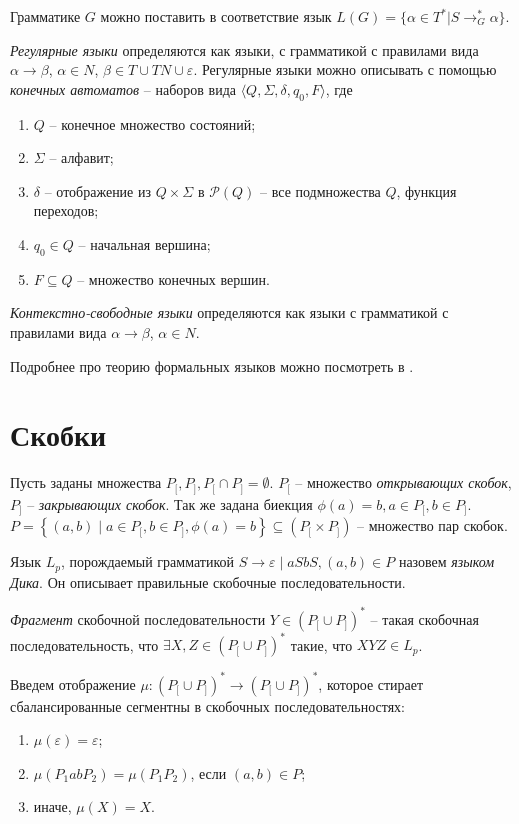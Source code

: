 Грамматике $G$ можно поставить в соответствие язык $L(G) = \{ \alpha \in T^* | S \rightarrow_G^* \alpha \}$. 

\emph{Регулярные языки} определяются как языки, с грамматикой с правилами вида $\alpha \rightarrow \beta$, $\alpha \in N$, $\beta \in T \cup TN \cup \varepsilon$.
Регулярные языки можно описывать с помощью \emph{конечных автоматов} -- наборов вида $\langle Q, \Sigma, \delta, q_0, F \rangle$, где
\begin{enumerate}[label=\arabic*)]
    \item $Q$ -- конечное множество состояний;
    \item $\Sigma$ -- алфавит;
    \item $\delta$ -- отображение из $Q \times \Sigma$ в $\mathcal{P} (Q)$ -- все подмножества $Q$, функция переходов;
    \item $q_0 \in Q$ -- начальная вершина;
    \item $F \subseteq Q$ -- множество конечных вершин.
\end{enumerate}

\emph{Контекстно-свободные языки} определяются как языки с грамматикой с правилами вида $\alpha \rightarrow \beta$, $\alpha \in N$. 

Подробнее про теорию формальных языков можно посмотреть в \cite{handbook_of_formal}.

\section{Скобки}


Пусть заданы множества $P_[, P_], P_[ \cap P_] = \emptyset$. 
$P_[$ -- множество \emph{открывающих скобок}, $P_]$ -- \emph{закрывающих скобок}.
Так же задана биекция $\phi(a) = b, a \in P_[, b \in P_]$.
$P = \left\{ (a, b) \mid a \in P_[, b \in P_], \phi(a) = b \right\} \subseteq \left( P_[ \times P_] \right)$ -- множество пар скобок.

Язык $L_p$, порождаемый грамматикой $S \rightarrow \varepsilon \mid a S b S, (a, b) \in P$ назовем \emph{языком Дика}. 
Он описывает правильные скобочные последовательности.

\emph{Фрагмент} скобочной последовательности $Y \in (P_[ \cup P_])^*$ -- такая скобочная последовательность, 
что $\exists X, Z \in (P_[ \cup P_])^*$ такие, что $XYZ \in L_p$.

Введем отображение $\mu : (P_[ \cup P_])^* \to (P_[ \cup P_])^* $, которое стирает сбалансированные сегментны в скобочных последовательностях:
\begin{enumerate}[label=\arabic*)]
    \item $\mu(\varepsilon) = \varepsilon$;
    \item $\mu(P_1 a b P_2) = \mu(P_1 P_2)$, если $(a, b) \in P$;
    \item иначе, $\mu(X) = X$.
\end{enumerate}

